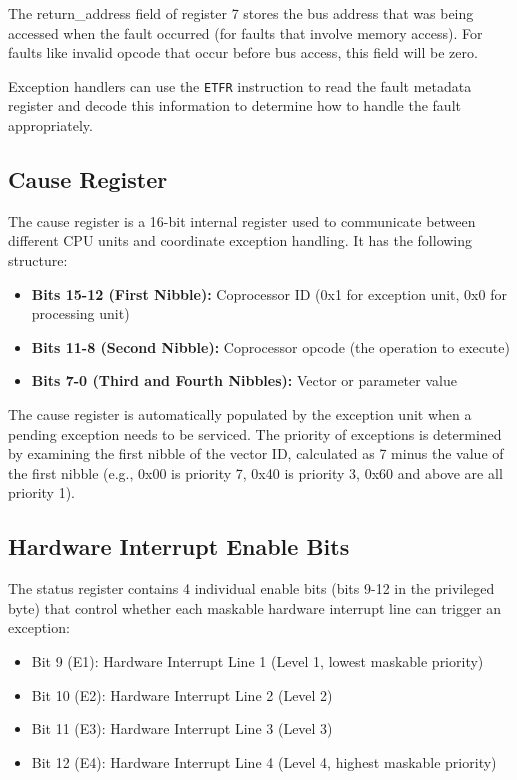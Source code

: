 The return\_address field of register 7 stores the bus address that was being accessed when the fault occurred (for
faults that involve memory access). For faults like invalid opcode that occur before bus access, this field will be
zero.

Exception handlers can use the \texttt{ETFR} instruction to read the fault metadata register and decode this
information to determine how to handle the fault appropriately.

\subsection{Cause Register}

The cause register is a 16-bit internal register used to communicate between different CPU units and coordinate
exception handling. It has the following structure:

\begin{itemize}
	\item \textbf{Bits 15-12 (First Nibble):} Coprocessor ID (0x1 for exception unit, 0x0 for processing unit)
	\item \textbf{Bits 11-8 (Second Nibble):} Coprocessor opcode (the operation to execute)
	\item \textbf{Bits 7-0 (Third and Fourth Nibbles):} Vector or parameter value
\end{itemize}

The cause register is automatically populated by the exception unit when a pending exception needs to be serviced. The
priority of exceptions is determined by examining the first nibble of the vector ID, calculated as 7 minus the value of
the first nibble (e.g., 0x00 is priority 7, 0x40 is priority 3, 0x60 and above are all priority 1).

\subsection{Hardware Interrupt Enable Bits}

The status register contains 4 individual enable bits (bits 9-12 in the privileged byte) that control whether each
maskable hardware interrupt line can trigger an exception:

\begin{itemize}
	\item Bit 9 (E1): Hardware Interrupt Line 1 (Level 1, lowest maskable priority)
	\item Bit 10 (E2): Hardware Interrupt Line 2 (Level 2)
	\item Bit 11 (E3): Hardware Interrupt Line 3 (Level 3)
	\item Bit 12 (E4): Hardware Interrupt Line 4 (Level 4, highest maskable priority)
\end{itemize}

